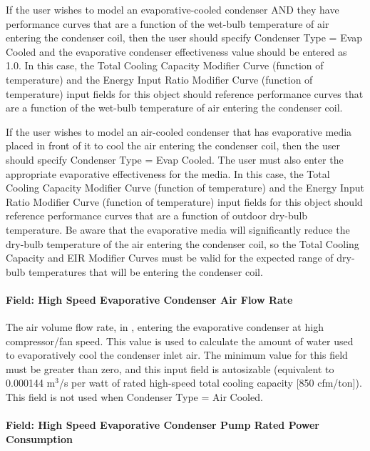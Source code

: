If the user wishes to model an evaporative-cooled condenser AND they have performance curves that are a function of the wet-bulb temperature of air entering the condenser coil, then the user should specify Condenser Type = Evap Cooled and the evaporative condenser effectiveness value should be entered as 1.0. In this case, the Total Cooling Capacity Modifier Curve (function of temperature) and the Energy Input Ratio Modifier Curve (function of temperature) input fields for this object should reference performance curves that are a function of the wet-bulb temperature of air entering the condenser coil.

If the user wishes to model an air-cooled condenser that has evaporative media placed in front of it to cool the air entering the condenser coil, then the user should specify Condenser Type = Evap Cooled. The user must also enter the appropriate evaporative effectiveness for the media. In this case, the Total Cooling Capacity Modifier Curve (function of temperature) and the Energy Input Ratio Modifier Curve (function of temperature) input fields for this object should reference performance curves that are a function of outdoor dry-bulb temperature. Be aware that the evaporative media will significantly reduce the dry-bulb temperature of the air entering the condenser coil, so the Total Cooling Capacity and EIR Modifier Curves must be valid for the expected range of dry-bulb temperatures that will be entering the condenser coil.

\paragraph{Field: High Speed Evaporative Condenser Air Flow Rate}\label{field-high-speed-evaporative-condenser-air-flow-rate}

The air volume flow rate, in \si{\volumeFlowRate}, entering the evaporative condenser at high compressor/fan speed. This value is used to calculate the amount of water used to evaporatively cool the condenser inlet air. The minimum value for this field must be greater than zero, and this input field is autosizable (equivalent to 0.000144 m\(^{3}\)/s per watt of rated high-speed total cooling capacity {[}850 cfm/ton{]}). This field is not used when Condenser Type = Air Cooled.

\paragraph{Field: High Speed Evaporative Condenser Pump Rated Power Consumption}\label{field-high-speed-evaporative-condenser-pump-rated-power-consumption}

